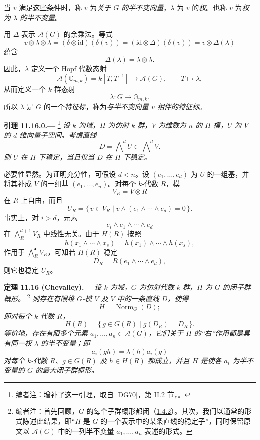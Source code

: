 当 \(v\) 满足这些条件时，称 \(v\) 为\emph{关于 \(G\) 的半不变向量}，\(\lambda\) 为 \(v\) 的\emph{权}。也称 \(v\) 为\emph{权为 \(\lambda\) 的半不变量}。

用 \(\Delta\) 表示 \(\mathcal A(G)\) 的余乘法。等式
\label{form:sga3-VIB-11.15-group-like}%
\[
  v\otimes\lambda\otimes\lambda
  =
  (\delta\otimes\mathrm{id})(\delta(v))
  =
  (\mathrm{id}\otimes\Delta)(\delta(v))
  =
  v\otimes\Delta(\lambda)
\]
蕴含
\[
  \Delta(\lambda)=\lambda\otimes\lambda.
\]
因此，\(\lambda\) 定义一个 Hopf 代数态射
\[
  \mathcal A(\mathbb G_{m,k})
    =k[T,T^{-1}]
    \longrightarrow\mathcal A(G),
  \qquad T\longmapsto\lambda,
\]
从而定义一个 \(k\)-群态射
\[
  \lambda:G\longrightarrow\mathbb G_{m,k}.
\]
所以 \(\lambda\) 是 \(G\) 的一个\emph{特征标}，称为\emph{与半不变向量 \(v\) 相伴的特征标}。

\medskip
{}\label{lem:sga3-VIB-11.16.0}%
\noindent\textbf{引理 11.16.0.---}%
\footnote{\label{note:sga3-VIB-128}编者注：增补了这一引理，取自 \textup{[DG70]}，第 II.2 节，。}
\emph{设 \(k\) 为域，\(H\) 为仿射 \(k\)-群，\(V\) 为维数为 \(n\) 的 \(H\)-模，\(U\) 为 \(V\) 的 \(d\) 维向量子空间。考虑直线}
\[
  D=\bigwedge\nolimits^dU
    \subset\bigwedge\nolimits^dV.
\]
\emph{则 \(U\) 在 \(H\) 下稳定，当且仅当 \(D\) 在 \(H\) 下稳定。}

必要性显然。为证明充分性，可假设 \(d<n\)。设 \((e_1,\ldots,e_d)\) 为 \(U\) 的一组基，并将其补成 \(V\) 的一组基 \((e_1,\ldots,e_n)\)。对每个 \(k\)-代数 \(R\)，模
\[
  V_R=V\otimes R
\]
在 \(R\) 上自由，而且
\label{form:sga3-VIB-11.16.0-UR}%
\[
  U_R
  =
  \{\,v\in V_R\mid
    v\wedge(e_1\wedge\cdots\wedge e_d)=0\,\}.
\]
事实上，对 \(i>d\)，元素
\[
  e_i\wedge e_1\wedge\cdots\wedge e_d
\]
在 \(\bigwedge_R^{d+1}V_R\) 中线性无关。由于 \(H(R)\) 按照
\[
  h(x_1\wedge\cdots\wedge x_s)
  =
  h(x_1)\wedge\cdots\wedge h(x_s),
\]
作用于 \(\bigwedge_R^\bullet V_R\)，可知若 \(H(R)\) 稳定
\[
  D_R=R(e_1\wedge\cdots\wedge e_d),
\]
则它也稳定 \(U_R\)。

\medskip
{}\label{thm:sga3-VIB-11.16}%
\noindent\textbf{定理 11.16 \textup{(Chevalley)}.---}
\emph{设 \(k\) 为域，\(G\) 为仿射代数 \(k\)-群，\(H\) 为 \(G\) 的闭子群概形。}%
\footnote{\label{note:sga3-VIB-129}编者注：首先回顾，\(G\) 的每个子群概形都闭\textup{（\hyperref[cor:sga3-VIB-1.4.2]{1.4.2}）}。其次，我们以通常的形式陈述此结果，即“\(H\) 是 \(G\) 的一个表示中的某条直线的稳定子”，同时保留原文以 \(\mathcal A(G)\) 中的一列半不变量 \(a_1,\ldots,a_n\) 表述的形式。}
\emph{则存在有限维 \(G\)-模 \(V\) 及 \(V\) 中的一条直线 \(D\)，使得}
\[
  H=\operatorname{Norm}_G(D);
\]
\emph{即对每个 \(k\)-代数 \(R\)，}
\label{form:sga3-VIB-11.16-stabilizer}%
\[
  H(R)=\{\,g\in G(R)\mid g(D_R)=D_R\,\}.
\]
\emph{等价地，存在有限多个元素 \(a_1,\ldots,a_n\in\mathcal A(G)\)，它们关于 \(H\) 的“右”作用都是具有同一权 \(\lambda\) 的半不变量；即}
\[
  a_i(gh)=\lambda(h)a_i(g)
\]
\emph{对每个 \(k\)-代数 \(R\)、\(g\in G(R)\) 及 \(h\in H(R)\) 都成立，并且 \(H\) 是使各 \(a_i\) 为半不变量的 \(G\) 的最大闭子群概形。}

